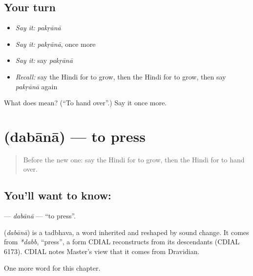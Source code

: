 \subsection*{Your turn}
\begin{itemize}
\raggedright
  \item \emph{Say it:} \emph{pakṛānā}
  \item \emph{Say it:} \emph{pakṛānā}, once more
  \item \emph{Say it:} say \emph{pakṛānā}
  \item \emph{Recall:} say the Hindi for to grow, then the Hindi for to grow, then say \emph{pakṛānā} again
\end{itemize}

\begin{tcolorbox}[breakable,colback=teal!4,colframe=teal!35!black,title={Before you move on}]
What does  mean? (\textquotedblleft{}To hand over\textquotedblright{}.) Say it once more.
\end{tcolorbox}
\section[\texorpdfstring{\hi{दबाना} (dabānā)}{दबाना (dabānā)}]{ (dabānā) — to press}

\label{lesson:HI-C228-dabana}



\begin{quote}
Before the new one: say the Hindi for to grow, then the Hindi for to hand over.
\end{quote}

\subsection*{You'll want to know: }
\textbf{} — \emph{dabānā} — \textquotedblleft{}to press\textquotedblright{}.

\begin{cousinweb}
\textbf{} (\emph{dabānā}) is a tadbhava, a word inherited and reshaped by sound change. It comes from \emph{*dabb}, \textquotedblleft{}press\textquotedblright{}, a form CDIAL reconstructs from its descendants (CDIAL 6173). CDIAL notes Master's view that it comes from Dravidian.
\end{cousinweb}

\begin{grammarlens}[title={What you've built}]
One more word for this chapter.
\end{grammarlens}

